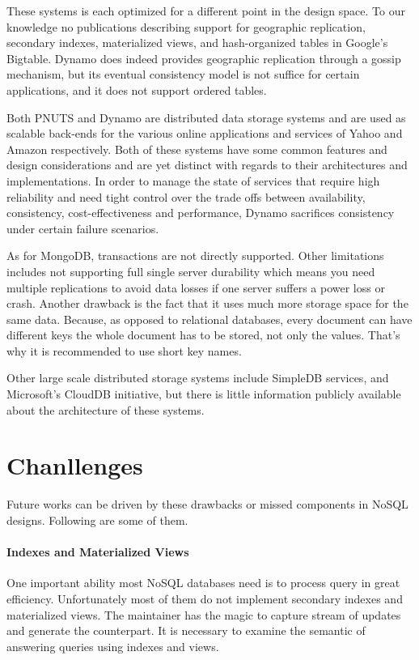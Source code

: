 \documentclass[letter,twocolumn]{article}
\begin{document}
These systems is each optimized for a different point in the design space. To our knowledge no publications describing support for geographic replication, secondary indexes, materialized views, and hash-organized tables in Google's Bigtable. Dynamo does indeed provides geographic replication through a gossip mechanism, but its eventual consistency model is not suffice for certain applications, and it does not support ordered tables. 

Both PNUTS and Dynamo are distributed data storage systems and are used as scalable back-ends for the various online applications and services of Yahoo and Amazon respectively. Both of these systems have some common features and design considerations and are yet distinct with regards to their architectures and implementations. In order to manage the state of services that require high reliability and need tight control over the trade offs between availability, consistency, cost-effectiveness and performance, Dynamo sacrifices consistency under certain failure scenarios.

As for MongoDB, transactions are not directly supported. Other limitations includes not supporting full single server durability which means you need multiple replications to avoid data losses if one server suffers a power loss or crash. Another drawback is the fact that it uses much more storage space for the same data. Because, as opposed to relational databases, every document can have different keys the whole document has to be stored, not only the values. That's why it is recommended to use short key names.

Other large scale distributed storage systems include SimpleDB services, and Microsoft’s CloudDB initiative, but there is little information publicly available about the architecture of these systems.

\section{Chanllenges}
Future works can be driven by these drawbacks or missed components in NoSQL designs. Following are some of them.

\paragraph*{Indexes and Materialized Views} 
One important ability most NoSQL databases need is to process query in great efficiency. Unfortunately most of them do not implement secondary indexes and materialized views. The maintainer has the magic to capture stream of updates and generate the counterpart. It is necessary to examine the semantic of answering queries using indexes and views.
\end{document}
